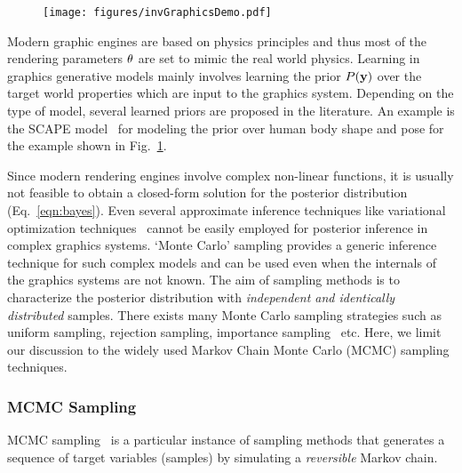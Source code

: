 \begin{figure}[t]
\begin{center}
\centerline{\texttt{[image: figures/invGraphicsDemo.pdf]}}
\label{fig:invgraphicsteaser}
\end{center}
\end{figure}

Modern graphic engines are based on physics principles and thus most of the
rendering parameters $\mathbf{\theta}$ are set to mimic the real world physics. Learning in graphics
generative models mainly involves learning the prior $P(\mathbf{y})$
over the target world properties which are input to the graphics system.
Depending on the type of model, several learned priors are proposed in the
literature. An example is the SCAPE model~\cite{anguelov2005scape,hirshberg2012coregistration}
for modeling the prior over human body shape and pose for the example
shown in Fig.~\ref{fig:invgraphicsteaser}.

Since modern rendering engines involve complex non-linear functions, it is
usually not feasible to obtain a closed-form solution for the posterior distribution
(Eq.~\ref{eqn:bayes}). Even several approximate inference techniques like
variational optimization techniques~\cite{koller2009probabilistic} cannot
be easily employed for posterior inference in complex graphics systems.
`Monte Carlo' sampling provides a generic inference technique for
such complex models and can be used even when the internals
of the graphics systems are not known. The aim of sampling methods is to
characterize the posterior distribution with \emph{independent and identically
distributed} samples. There exists many Monte Carlo sampling
strategies such as uniform sampling, rejection sampling,
importance sampling~\cite{hammersley1954poor,rosenbluth1955monte} etc.
Here, we limit our discussion to the widely used Markov Chain Monte Carlo (MCMC)
sampling techniques.

\subsubsection*{MCMC Sampling}
%
MCMC sampling~\cite{metropolis1953} is a
particular instance of sampling methods that generates
a sequence of target variables (samples) by simulating a \textit{reversible}
Markov chain.

